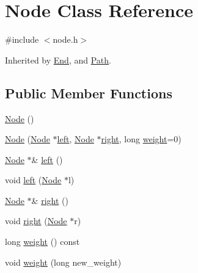 \hypertarget{class_node}{}\section{Node Class Reference}
\label{class_node}


{\ttfamily \#include $<$node.\+h$>$}



Inherited by \hyperlink{class_end}{End}, and \hyperlink{class_path}{Path}.

\subsection*{Public Member Functions}
\begin{DoxyCompactItemize}
\item 
\hyperlink{class_node_ad7a34779cad45d997bfd6d3d8043c75f}{Node} ()
\item 
\hyperlink{class_node_a0c8bfbf358813f67b2ef802fa75c6b17}{Node} (\hyperlink{class_node}{Node} $\ast$\hyperlink{class_node_af9438bd5c1df91946e72ee3f7f133a40}{left}, \hyperlink{class_node}{Node} $\ast$\hyperlink{class_node_a3eabc288cada601df9592ecf88d41220}{right}, long \hyperlink{class_node_a5c4198ce7dc69679ee19206ed0741b6d}{weight}=0)
\item 
\hyperlink{class_node}{Node} $\ast$\& \hyperlink{class_node_af9438bd5c1df91946e72ee3f7f133a40}{left} ()
\item 
void \hyperlink{class_node_afde9440840ad4576dd050ea734d02213}{left} (\hyperlink{class_node}{Node} $\ast$l)
\item 
\hyperlink{class_node}{Node} $\ast$\& \hyperlink{class_node_a3eabc288cada601df9592ecf88d41220}{right} ()
\item 
void \hyperlink{class_node_a71398b57ef3f9a78cfd8ff455877731d}{right} (\hyperlink{class_node}{Node} $\ast$r)
\item 
long \hyperlink{class_node_a5c4198ce7dc69679ee19206ed0741b6d}{weight} () const
\item 
void \hyperlink{class_node_a33692230d8ddf48354a54c2d461243a4}{weight} (long new\+\_\+weight)
\end{DoxyCompactItemize}
